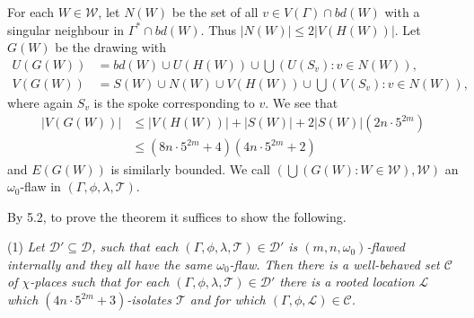 For each $W \in \mathscr{W}$, let $N(W)$ be the set of all $v \in V(\Gamma) \cap bd(W)$ with a singular neighbour in $\Gamma^* \cap bd(W)$. Thus $|N(W)| \le 2|V(H(W))|$. Let $G(W)$ be the drawing with
\begin{align*}
U(G(W)) &= bd(W) \cup U(H(W)) \cup \bigcup (U(S_v) : v \in N(W)), \\
V(G(W)) &= S(W) \cup N(W) \cup V(H(W)) \cup \bigcup (V(S_v) : v \in N(W)),
\end{align*}
where again $S_v$ is the spoke corresponding to $v$. We see that
\begin{align*}
|V(G(W))| &\le |V(H(W))| + |S(W)| + 2|S(W)|(2n \cdot 5^{2m}) \\
&\le (8n \cdot 5^{2m} + 4)(4n \cdot 5^{2m} + 2)
\end{align*}
and $E(G(W))$ is similarly bounded. We call $(\bigcup(G(W) : W \in \mathscr{W}), \mathscr{W})$ an $\omega_0$-flaw in $(\Gamma, \phi, \lambda, \mathscr{T})$.

By 5.2, to prove the theorem it suffices to show the following.

\hspace*{12pt}(1) \textit{Let $\mathscr{D}' \subseteq \mathscr{D}$, such that each $(\Gamma, \phi, \lambda, \mathscr{T}) \in \mathscr{D}'$ is $(m, n, \omega_0)$-flawed internally and they all have the same $\omega_0$-flaw. Then there is a well-behaved set $\mathscr{C}$ of $\chi$-places such that for each $(\Gamma, \phi, \lambda, \mathscr{T}) \in \mathscr{D}'$ there is a rooted location $\mathscr{L}$ which $(4n \cdot 5^{2m} + 3)$-isolates $\mathscr{T}$ and for which $(\Gamma, \phi, \mathscr{L}) \in \mathscr{C}$.}
